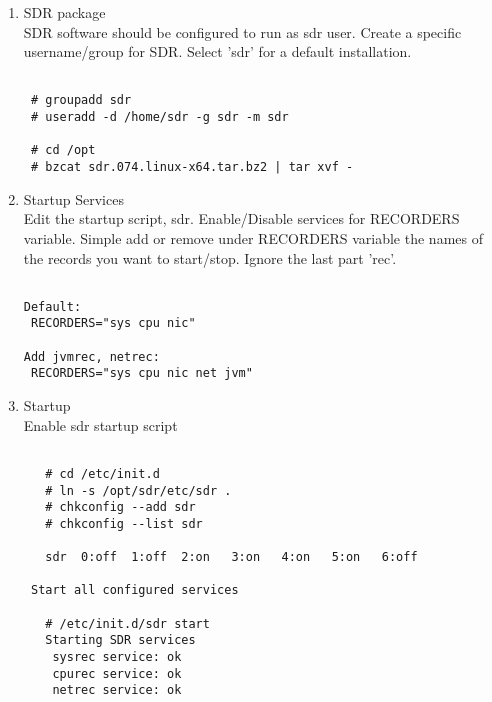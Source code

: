 \begin{enumerate}

\item SDR package\\
SDR software should be configured to run as sdr user. Create a specific 
username/group for SDR. Select 'sdr' for a default installation.

\begin{Verbatim}[fontsize=\relsize{-2},frame=single,
                 label=\fbox{Installation Package},
                 framesep=3mm,labelposition=bottomline]

 # groupadd sdr
 # useradd -d /home/sdr -g sdr -m sdr
     
 # cd /opt
 # bzcat sdr.074.linux-x64.tar.bz2 | tar xvf -

\end{Verbatim}


\item Startup Services\\ 
Edit the startup script, sdr. Enable/Disable services for RECORDERS variable.
Simple add or remove under RECORDERS variable the names of the records
you want to start/stop. Ignore the last part 'rec'.

\begin{Verbatim}[fontsize=\relsize{-2},frame=single,
                label=\fbox{Startup Services},
                framesep=2mm,labelposition=bottomline]

Default:
 RECORDERS="sys cpu nic"

Add jvmrec, netrec:
 RECORDERS="sys cpu nic net jvm"

\end{Verbatim}

\item Startup\\
Enable sdr startup script

\begin{Verbatim}[fontsize=\relsize{-2},frame=single,
                label=\fbox{Startup},
                framesep=2mm,labelposition=bottomline]

   # cd /etc/init.d
   # ln -s /opt/sdr/etc/sdr .
   # chkconfig --add sdr
   # chkconfig --list sdr
   
   sdr  0:off  1:off  2:on   3:on   4:on   5:on   6:off  

 Start all configured services

   # /etc/init.d/sdr start
   Starting SDR services
    sysrec service: ok
    cpurec service: ok
    netrec service: ok



\end{Verbatim}
\end{enumerate}
